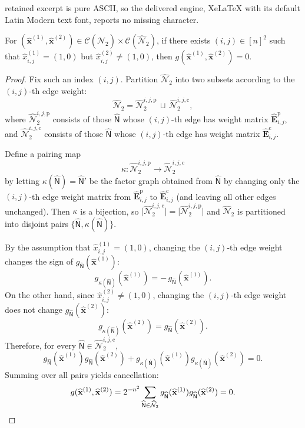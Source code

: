 \documentclass[10pt,a4paper]{amsart}
\newcommand{\hatbfx}[1][]{\widehat{\mathbf{x}}^{ #1 }}
\newcommand{\hatx}[1]{\widehat{x}_{ #1 }}
\newcommand{\sfn}{\mathsf{N}}
\newcommand{\validc}{\mathcal {C}(\widehat{\mathcal N}_2)}
\begin{document}
retained excerpt is pure ASCII, so the delivered engine, XeLaTeX with its default Latin Modern text font, reports no missing character.
 \begin{lem}
  For $(\hatbfx[(1)],\hatbfx[(2)])\in \validc\times \validc$, if there exists $(i,j)\in[n]^2$
  such that $\hatx{i,j}^{(1)}=(1,0)$ but $\hatx{i,j}^{(2)}\neq (1,0)$, then $g(\hatbfx[(1)],\hatbfx[(2)])=0$.
 \end{lem}

 \begin{proof}
  Fix such an index $(i,j)$. Partition $\widehat{\mathcal N}_2$ into two subsets according to
  the $(i,j)$-th edge weight:
  \[
   \widehat{\mathcal N}_2
   =\widehat{\mathcal N}_2^{i,j,\mathrm p}\,\sqcup\,\widehat{\mathcal N}_2^{i,j,\mathrm c},
  \]
  where $\widehat{\mathcal N}_2^{i,j,\mathrm p}$ consists of those
  $\widehat{\sfn}$ whose $(i,j)$-th edge has weight matrix $\widehat{\mathbf
  E}^{\mathrm p}_{i,j}$, and $\widehat{\mathcal N}_2^{i,j,\mathrm c}$ consists
  of those $\widehat{\sfn}$ whose $(i,j)$-th edge has weight matrix
  $\widehat{\mathbf E}^{\mathrm c}_{i,j}$.

  Define a pairing map
  \[
   \kappa:\widehat{\mathcal N}_2^{i,j,\mathrm p}\to \widehat{\mathcal N}_2^{i,j,\mathrm c}
  \]
  by letting $\kappa(\widehat{\sfn})=\widehat{\sfn}'$ be the factor graph
  obtained from $\widehat{\sfn}$ by changing only the $(i,j)$-th edge weight
  matrix from $\widehat{\mathbf E}^{\mathrm p}_{i,j}$ to $\widehat{\mathbf
  E}^{\mathrm c}_{i,j}$ (and leaving all other edges unchanged). Then $\kappa$
  is a bijection, so $\bigl|\widehat{\mathcal N}_2^{i,j,\mathrm c}\bigr|
  =\bigl|\widehat{\mathcal N}_2^{i,j,\mathrm p}\bigr|$ and $\widehat{\mathcal
  N}_2$ is partitioned into disjoint pairs
  $\{\widehat{\sfn},\kappa(\widehat{\sfn})\}$.

  By the assumption that $\hatx{i,j}^{(1)}=(1,0)$, changing the $(i,j)$-th edge
  weight changes the sign of $g_{\widehat{\sfn}}(\hatbfx[(1)])$:
  \[
   g_{\kappa(\widehat{\sfn})}(\hatbfx[(1)])=-\,g_{\widehat{\sfn}}(\hatbfx[(1)]).
  \]
  On the other hand, since $\hatx{i,j}^{(2)}\neq (1,0)$, changing the
  $(i,j)$-th edge weight does not change $g_{\widehat{\sfn}}(\hatbfx[(2)])$:
  \[
   g_{\kappa(\widehat{\sfn})}(\hatbfx[(2)])=g_{\widehat{\sfn}}(\hatbfx[(2)]).
  \]
  Therefore, for every $\widehat{\sfn}\in\widehat{\mathcal N}_2^{i,j,\mathrm
  c}$,
  \[
   g_{\widehat{\sfn}}(\hatbfx[(1)])g_{\widehat{\sfn}}(\hatbfx[(2)])
   +
   g_{\kappa(\widehat{\sfn})}(\hatbfx[(1)])g_{\kappa(\widehat{\sfn})}(\hatbfx[(2)])=0.
  \]
  Summing over all pairs yields cancellation:
  \[
   g(\hatbfx[(1)],\hatbfx[(2)])
   =2^{-n^2}\sum_{\widehat{\sfn}\in\widehat{\mathcal N}_2}
   g_{\widehat{\sfn}}(\hatbfx[(1)])g_{\widehat{\sfn}}(\hatbfx[(2)])=0. \qedhere
  \]
 \end{proof}
\end{document}
